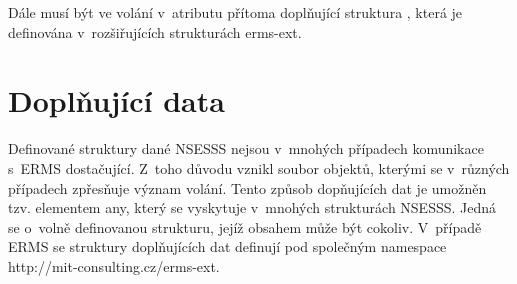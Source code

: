 \documentclass[
  master,
  field=ainfp,
  biblatex,
  language=czech,
  glossaries,
  theorems=false,
  index
]{kidiplom}
\begin{document}
\begin{table}
\begin{center}
\caption{Kódy typu zásilky u~vypravení pomocí DopisOnline}\label{tab:DopisOnline}
\end{center}
\end{table}

Dále musí být ve volání v~atributu  přítoma doplňující struktura , která je definována v~rozšiřujících strukturách erms-ext.

\newpage
\section{Doplňující data}

Definované struktury dané NSESSS nejsou v~mnohých případech komunikace s~ERMS dostačující. Z~toho důvodu vznikl soubor objektů, kterými se v~různých případech zpřesňuje význam volání. 
Tento způsob dopňujících dat je umožněn tzv. elementem any, který se vyskytuje v~mnohých strukturách NSESSS. Jedná se o~volně definovanou strukturu, jejíž obsahem může být cokoliv.
V~případě ERMS se struktury doplňujících dat definují pod společným namespace http://mit-consulting.cz/erms-ext.
\end{document}
